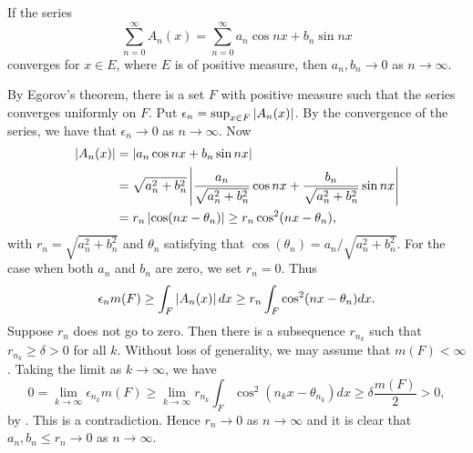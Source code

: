 \begin{problem}
    If the series 
    \begin{equation*}
        \sum_{n=0}^{\infty} A_n(x) = \sum_{n=0}^{\infty} a_n\cos nx + b_n\sin nx
    \end{equation*}
    converges for $x\in E$, where $E$ is of positive measure, then $a_n,b_n\to 0$ as $n\to\infty$.
\end{problem}
\begin{pf}
    By Egorov's theorem, there is a set $F$ with positive measure such that 
    the series converges uniformly on $F$. Put $\epsilon_n = \sup_{x\in F}\left\lvert {A_n(x)} \right\rvert$. 
    By the convergence of the series, we have that $\epsilon_n\to 0$ as $n\to\infty$. 
    Now 
    \begin{equation*}
        \begin{split}
            \left\lvert {A_n(x)} \right\rvert &= \left\lvert {a_n\cos nx + b_n\sin nx} \right\rvert \\
            &= \sqrt{a_n^2 + b_n^2}\left\lvert {\frac{a_n}{\sqrt{a_n^2 + b_n^2}}\cos nx + \frac{b_n}{\sqrt{a_n^2 + b_n^2}}\sin nx} \right\rvert \\
            &= r_n\left\lvert {\cos(nx - \theta_n)} \right\rvert \geq r_n \cos^2(nx - \theta_n),
        \end{split}
    \end{equation*}
    with $r_n = \sqrt{a_n^2 + b_n^2}$ and $\theta_n$ satisfying that $\cos(\theta_n) = a_n/\sqrt{a_n^2 + b_n^2}$. 
    For the case when both $a_n$ and $b_n$ are zero, we set $r_n = 0$. Thus 
    \begin{equation*}
        \epsilon_nm(F) \geq \int_F \left\lvert {A_n(x)} \right\rvert dx \geq r_n\int_F \cos^2(nx - \theta_n)dx.
    \end{equation*}
    Suppose $r_n$ does not go to zero. Then there is a subsequence $r_{n_k}$ such that 
    $r_{n_k} \geq \delta > 0$ for all $k$. Without loss of generality, we may assume that 
    $m(F) < \infty$. Taking the limit as $k\to\infty$, we have 
    \begin{equation*}
        0 = \lim_{k\to\infty}\epsilon_{n_k}m(F) \geq \lim_{k\to\infty}r_{n_k}\int_F \cos^2(n_{k}x - \theta_{n_k})dx \geq \delta \frac{m(F)}{2} > 0,
    \end{equation*}
    by . This is a contradiction. Hence $r_n\to 0$ as $n\to\infty$ and 
    it is clear that $a_n, b_n\leq r_n\to 0$ as $n\to\infty$.
\end{pf}

